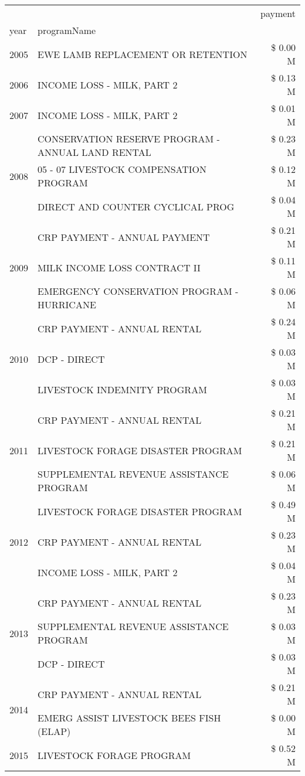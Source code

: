\begin{tabular}{llr}
\toprule
 &  & payment \\
year & programName &  \\
\midrule
2005 & EWE LAMB REPLACEMENT OR RETENTION & \$ 0.00 M \\
\cline{1-3}
2006 & INCOME LOSS - MILK, PART 2 & \$ 0.13 M \\
\cline{1-3}
2007 & INCOME LOSS - MILK, PART 2 & \$ 0.01 M \\
\cline{1-3}
\multirow[t]{3}{*}{2008} & CONSERVATION RESERVE PROGRAM - ANNUAL LAND RENTAL & \$ 0.23 M \\
 & 05 - 07 LIVESTOCK COMPENSATION PROGRAM & \$ 0.12 M \\
 & DIRECT AND COUNTER CYCLICAL PROG & \$ 0.04 M \\
\cline{1-3}
\multirow[t]{3}{*}{2009} & CRP PAYMENT - ANNUAL PAYMENT & \$ 0.21 M \\
 & MILK INCOME LOSS CONTRACT II & \$ 0.11 M \\
 & EMERGENCY CONSERVATION PROGRAM - HURRICANE & \$ 0.06 M \\
\cline{1-3}
\multirow[t]{3}{*}{2010} & CRP PAYMENT - ANNUAL RENTAL & \$ 0.24 M \\
 & DCP - DIRECT & \$ 0.03 M \\
 & LIVESTOCK INDEMNITY PROGRAM & \$ 0.03 M \\
\cline{1-3}
\multirow[t]{3}{*}{2011} & CRP PAYMENT - ANNUAL RENTAL & \$ 0.21 M \\
 & LIVESTOCK FORAGE DISASTER PROGRAM & \$ 0.21 M \\
 & SUPPLEMENTAL REVENUE ASSISTANCE PROGRAM & \$ 0.06 M \\
\cline{1-3}
\multirow[t]{3}{*}{2012} & LIVESTOCK FORAGE DISASTER PROGRAM & \$ 0.49 M \\
 & CRP PAYMENT - ANNUAL RENTAL & \$ 0.23 M \\
 & INCOME LOSS - MILK, PART 2 & \$ 0.04 M \\
\cline{1-3}
\multirow[t]{3}{*}{2013} & CRP PAYMENT - ANNUAL RENTAL & \$ 0.23 M \\
 & SUPPLEMENTAL REVENUE ASSISTANCE PROGRAM & \$ 0.03 M \\
 & DCP - DIRECT & \$ 0.03 M \\
\cline{1-3}
\multirow[t]{2}{*}{2014} & CRP PAYMENT - ANNUAL RENTAL & \$ 0.21 M \\
 & EMERG ASSIST LIVESTOCK BEES FISH (ELAP) & \$ 0.00 M \\
\cline{1-3}
\multirow[t]{3}{*}{2015} & LIVESTOCK FORAGE PROGRAM & \$ 0.52 M \\

\end{tabular}
